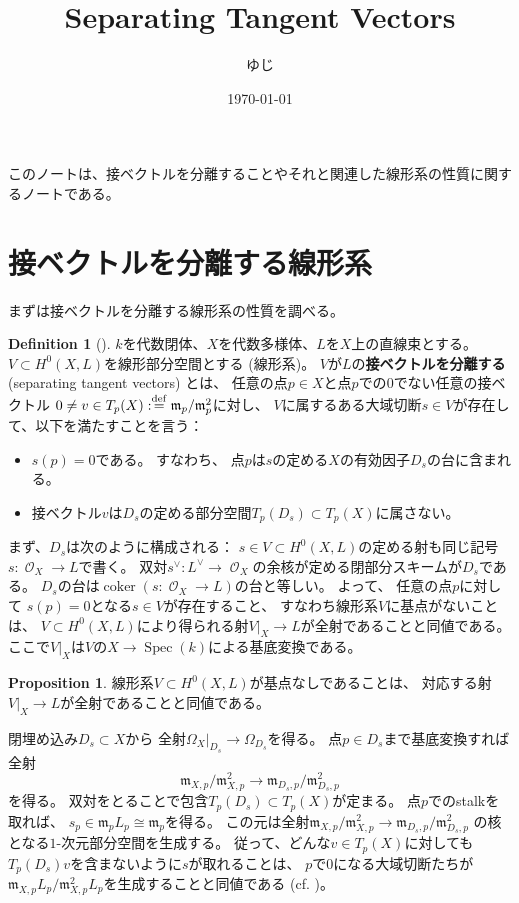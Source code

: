 \documentclass[uplatex]{jsarticle}
\title{Separating Tangent Vectors}
\author{ゆじ}
\date{\today}
\theoremstyle{definition}
\newtheorem{prop}[prop]{Proposition}
\newtheorem{defi}[defi]{Definition}
\DeclareMathOperator{\coker}{\mathrm{coker}}
\DeclareMathOperator{\Spec}{\mathrm{Spec}}
\newcommand{\mcO}{\mathcal{O}}
\DeclareMathOperator{\OOO}{\mcO}
\newcommand{\OX}{\OOO_X}
\newcommand{\dfn}{:\overset{\mathrm{\scriptsize def}}{=}}
\begin{document}
\maketitle


このノートは、接ベクトルを分離することやそれと関連した線形系の性質に関するノートである。

\section{接ベクトルを分離する線形系}


まずは接ベクトルを分離する線形系の性質を調べる。


\begin{defi}[{\cite[Remark II.7.8.2]{Ha}}]
  \(k\)を代数閉体、\(X\)を代数多様体、\(L\)を\(X\)上の直線束とする。
  \(V\subset H^0(X,L)\)を線形部分空間とする (線形系)。
  \(V\)が\(L\)の\textbf{接ベクトルを分離する} (separating tangent vectors)
  とは、
  任意の点\(p\in X\)と点\(p\)での\(0\)でない任意の接ベクトル
  \(0\neq v\in T_p(X)\dfn \mathfrak{m}_p/\mathfrak{m}_p^2\)に対し、
  \(V\)に属するある大域切断\(s\in V\)が存在して、以下を満たすことを言う：
  \begin{itemize}
    \item
    \(s(p)=0\)である。
    すなわち、
    点\(p\)は\(s\)の定める\(X\)の有効因子\(D_s\)の台に含まれる。
    \item
    接ベクトル\(v\)は\(D_s\)の定める部分空間\(T_p(D_s)\subset T_p(X)\)に属さない。
  \end{itemize}
\end{defi}


まず、\(D_s\)は次のように構成される：
\(s\in V\subset H^0(X,L)\)の定める射も同じ記号
\(s:\OX\to L\)で書く。
双対\(s^{\vee}:L^{\vee}\to \OX\)の余核が定める閉部分スキームが\(D_s\)である。
\(D_s\)の台は\(\coker(s:\OX\to L)\)の台と等しい。
よって、
任意の点\(p\)に対して
\(s(p)=0\)となる\(s\in V\)が存在すること、
すなわち線形系\(V\)に基点がないことは、
\(V\subset H^0(X,L)\)により得られる射\(V|_X\to L\)が全射であることと同値である。
ここで\(V|_X\)は\(V\)の\(X\to \Spec (k)\)による基底変換である。

\begin{prop}\label{prop: BPF surj}
  線形系\(V\subset H^0(X,L)\)が基点なしであることは、
  対応する射\(V|_X\to L\)が全射であることと同値である。
\end{prop}



閉埋め込み\(D_s\subset X\)から
全射\(\Omega_X|_{D_s}\to \Omega_{D_s}\)を得る。
点\(p\in D_s\)まで基底変換すれば全射
\[
\mathfrak{m}_{X,p}/\mathfrak{m}_{X,p}^2\to
\mathfrak{m}_{D_s,p}/\mathfrak{m}_{D_s,p}^2
\]
を得る。
双対をとることで包含\(T_p(D_s)\subset T_p(X)\)が定まる。
点\(p\)でのstalkを取れば、
\(s_p\in \mathfrak{m}_pL_p\cong \mathfrak{m}_p\)を得る。
この元は全射\(\mathfrak{m}_{X,p}/\mathfrak{m}_{X,p}^2\to
\mathfrak{m}_{D_s,p}/\mathfrak{m}_{D_s,p}^2\)
の核となる\(1\)-次元部分空間を生成する。
従って、どんな\(v\in T_p(X)\)に対しても\(T_p(D_s)\)\(v\)を含まないように\(s\)が取れることは、
\(p\)で\(0\)になる大域切断たちが
\(\mathfrak{m}_{X,p}L_p/\mathfrak{m}_{X,p}^2L_p\)を生成することと同値である
(cf. \cite[Theorem 7.3.(2)]{Ha})。
\end{document}
